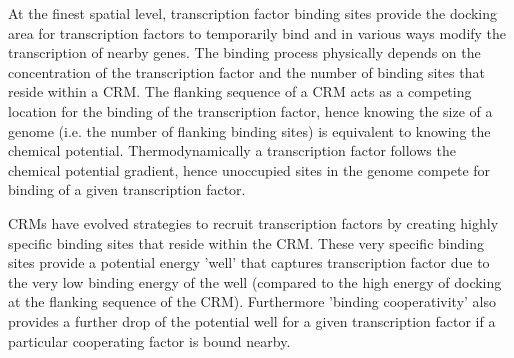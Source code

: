 At the finest spatial level, transcription factor binding sites provide the docking area for transcription factors to temporarily bind and in various ways modify the transcription of nearby genes.  The binding process physically depends on the concentration of the transcription factor and the number of binding sites that reside within a CRM.  The flanking sequence of a CRM acts as a competing location for the binding of the transcription factor, hence knowing the size of a genome (i.e. the number of flanking binding sites) is equivalent to knowing the chemical potential.  Thermodynamically a transcription factor follows the chemical potential gradient, hence unoccupied sites in the genome compete for binding of a given transcription factor.  

CRMs have evolved strategies to recruit transcription factors by creating highly specific binding sites that reside within the CRM.  These very specific binding sites provide a potential energy 'well' that captures transcription factor due to the very low binding energy of the well (compared to the high energy of docking at the flanking sequence of the CRM).  Furthermore 'binding cooperativity' also provides a further drop of the potential well for a given transcription factor if a particular cooperating factor is bound nearby.  

